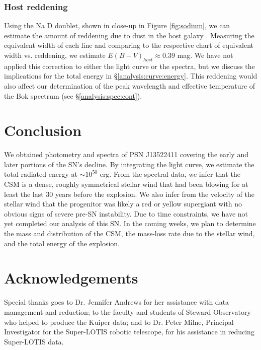 \documentclass[iop]{emulateapj}
\begin{document}
\subsubsection{Host reddening} \label{analysis:spec:red}
Using the Na D doublet, shown in close-up in Figure \ref{fig:sodium}, we can estimate the amount of reddening due to dust in the host galaxy \citep{Poz12}. Measuring the equivalent width of each line and comparing to the respective chart of equivalent width vs. reddening, we estimate $E(B-V)_{host} \approx 0.39$ mag. We have not applied this correction to either the light curve or the spectra, but we discuss the implications for the total energy in \S \ref{analysis:curve:energy}. This reddening would also affect our determination of the peak wavelength and effective temperature of the Bok spectrum (see \S \ref{analysis:spec:cont}).

\section{Conclusion} \label{conclusion}
We obtained photometry and spectra of PSN J13522411 covering the early and later portions of the SN's decline. By integrating the light curve, we estimate the total radiated energy at $\sim10^{50}$ erg. From the spectral data, we infer that the CSM is a dense, roughly symmetrical stellar wind that had been blowing for at least the last 30 years before the explosion. We also infer from the velocity of the stellar wind that the progenitor was likely a red or yellow supergiant with no obvious signs of severe pre-SN instability. Due to time constraints, we have not yet completed our analysis of this SN. In the coming weeks, we plan to determine the mass and distribution of the CSM, the mass-loss rate due to the stellar wind, and the total energy of the explosion.

\section{Acknowledgements}
Special thanks goes to Dr. Jennifer Andrews for her assistance with data management and reduction; to the faculty and students of Steward Observatory who helped to produce the Kuiper data; and to Dr. Peter Milne, Principal Investigator for the Super-LOTIS robotic telescope, for his assistance in reducing Super-LOTIS data.
\end{document}
